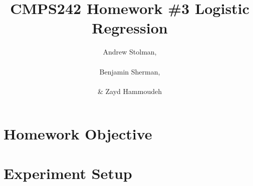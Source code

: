 \documentclass{report}
\title{\textbf{CMPS242 Homework \#3 \textendash{} Logistic Regression}}
\author{Andrew Stolman, \\~\\ Benjamin Sherman, \\~\\ \& Zayd Hammoudeh}
\begin{document}
  \maketitle
  
 
  \section{Homework Objective}
 
  \section{Experiment Setup}
 
\end{document}
